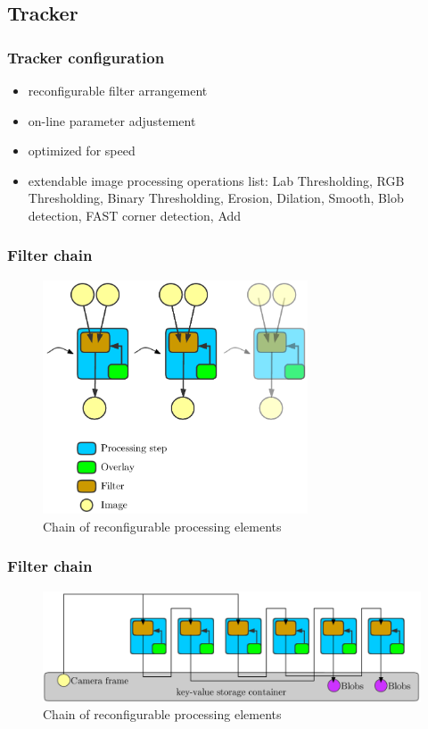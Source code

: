 \documentclass{beamer}
\begin{document}
	\subsection{Tracker}
	\begin{frame}
		\frametitle{Tracker configuration}
		\begin{itemize}
			\item reconfigurable filter arrangement
			\item on-line parameter adjustement
			\item optimized for speed
			\item extendable image processing operations list: Lab Thresholding, RGB Thresholding, Binary Thresholding, Erosion, Dilation, Smooth, Blob detection, FAST corner detection, Add
		\end{itemize}
	\end{frame}
	\begin{frame}
		\frametitle{Filter chain}
		\begin{figure}
			\hspace*{-2cm}
			\includegraphics[width=0.7\textwidth]{images/steps_general} 
			\caption{Chain of reconfigurable processing elements}
		\end{figure}
	\end{frame}
	\begin{frame}
		\frametitle{Filter chain}
		\begin{figure}
			\hspace*{-2cm}
			\includegraphics[width=1.3\textwidth]{images/steps_egr} 
			\caption{Chain of reconfigurable processing elements}
		\end{figure}
	\end{frame}
\end{document}
